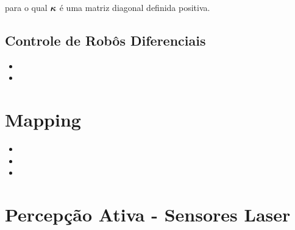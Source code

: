    \noindent para o qual \( \boldsymbol{\kappa} \) é uma matriz diagonal definida positiva.
    
    

    \subsection{Controle de Robôs Diferenciais}
    \label{sec:Controle_Robos_Diferenciais}

    
\begin{itemize} 
    \item {}
    \item {}
\end{itemize}    


\section{Mapping}

\begin{itemize}
    \item {}
    \item {}
    \item {}
\end{itemize}



\section{Percepção Ativa - Sensores Laser}










